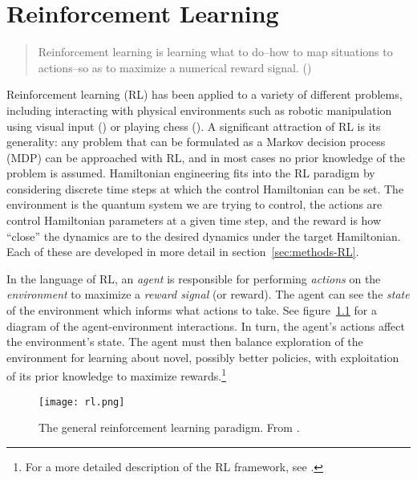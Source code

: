 
\chapter{Reinforcement Learning}



\begin{quote}
    Reinforcement learning is learning what to do--how to map situations to actions--so as to maximize a numerical reward signal. (\cite{sutton2018reinforcement})
\end{quote}
Reinforcement learning  (RL) has been applied to a variety of different problems, including interacting with physical environments such as robotic manipulation using visual input (\cite{lillicrap2015continuous}) or playing chess (\cite{Silver1140}). A significant attraction of RL is its generality: any problem that can be formulated as a Markov decision process (MDP) can be approached with RL, and in most cases no prior knowledge of the problem is assumed.
Hamiltonian engineering
fits into
the RL paradigm by considering discrete time steps at which the control Hamiltonian can be set.
The environment is the quantum system we are trying to control, the actions are control Hamiltonian parameters at a given time step,
and the reward is how ``close'' the dynamics are to the desired dynamics under the target Hamiltonian. Each of these are developed in more detail in section~\ref{sec:methods-RL}.

In the language of RL, an \emph{agent} is responsible for performing \emph{actions} on the \emph{environment} to maximize a \emph{reward signal} (or reward). The agent can see the \emph{state} of the environment which informs what actions to take. See figure~\ref{fig:RL} for a diagram of the agent-environment interactions. In turn, the agent's actions affect the environment's state. The agent must then balance exploration of the environment for learning about novel, possibly better policies, with exploitation of its prior knowledge to maximize rewards.\footnote{
For a more detailed description of the RL framework, see \cite{sutton2018reinforcement}.
}

\begin{figure}[H]
    \centering
    \texttt{[image: rl.png]}
    \caption{The general reinforcement learning paradigm. From \cite{sutton2018reinforcement}.}
    \label{fig:RL}
\end{figure}

